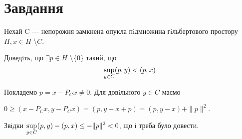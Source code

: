 
\chapter{Завдання \theHchapter}


\begin{tcolorbox}[title=Завдання]
    
    Нехай C — непорожня замкнена опукла пiдмножина гiльбертового 
    простору $ H, x \in H $ \textbackslash $C $.
    
    
    Доведiть, що $ \exists p \in H$ \textbackslash $\{0\} $ такий, що
    $$ \displaystyle\sup_{y \in C} (p, y) < (p, x) $$

    
\end{tcolorbox}



Покладемо $p = x - P_C x \neq 0$. Для довiльного $y \in C$ маємо


$0 \geq (x - P_C x, y - P_C x)=(p, y - x + p)=(p, y - x) + \|p\| ^2$.


Звiдки $ \displaystyle\sup_{y \in C} (p, y) - (p, x) \le - \|p\| ^ 2 < 0 $,
що i треба було довести.

